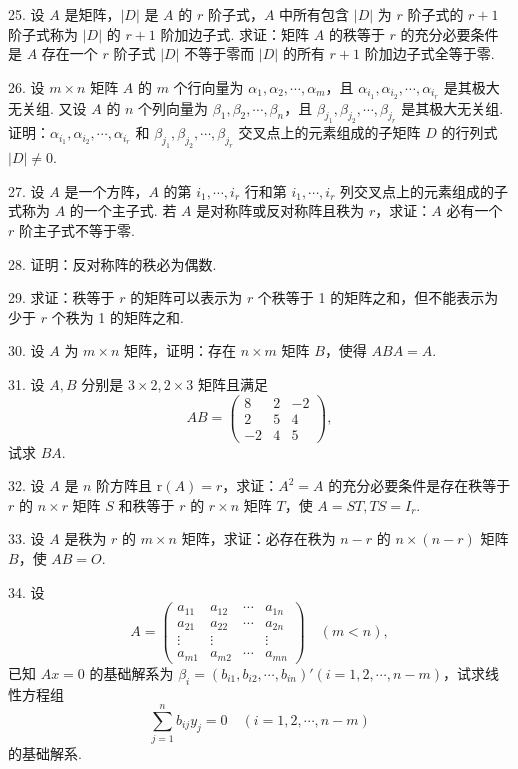 \documentclass[UTF8, 12pt, fontset=fandol, oneside]{ctexart}
\begin{document}
25. 设 $A$ 是矩阵，$|D|$ 是 $A$ 的 $r$ 阶子式，$A$ 中所有包含 $|D|$ 为 $r$ 阶子式的 $r+1$ 阶子式称为 $|D|$ 的 $r+1$ 阶加边子式. 求证：矩阵 $A$ 的秩等于 $r$ 的充分必要条件是 $A$ 存在一个 $r$ 阶子式 $|D|$ 不等于零而 $|D|$ 的所有 $r+1$ 阶加边子式全等于零.

26. 设 $m\times n$ 矩阵 $A$ 的 $m$ 个行向量为 $\alpha_1,\alpha_2,\cdots,\alpha_m$，且 $\alpha_{i_1},\alpha_{i_2},\cdots,\alpha_{i_r}$ 是其极大无关组. 又设 $A$ 的 $n$ 个列向量为 $\beta_1,\beta_2,\cdots,\beta_n$，且 $\beta_{j_1},\beta_{j_2},\cdots,\beta_{j_r}$ 是其极大无关组. 证明：$\alpha_{i_1},\alpha_{i_2},\cdots,\alpha_{i_r}$ 和 $\beta_{j_1},\beta_{j_2},\cdots,\beta_{j_r}$ 交叉点上的元素组成的子矩阵 $D$ 的行列式 $|D|\neq 0$.

27. 设 $A$ 是一个方阵，$A$ 的第 $i_1,\cdots,i_r$ 行和第 $i_1,\cdots,i_r$ 列交叉点上的元素组成的子式称为 $A$ 的一个主子式. 若 $A$ 是对称阵或反对称阵且秩为 $r$，求证：$A$ 必有一个 $r$ 阶主子式不等于零.

28. 证明：反对称阵的秩必为偶数.

29. 求证：秩等于 $r$ 的矩阵可以表示为 $r$ 个秩等于 1 的矩阵之和，但不能表示为少于 $r$ 个秩为 1 的矩阵之和.

30. 设 $A$ 为 $m\times n$ 矩阵，证明：存在 $n\times m$ 矩阵 $B$，使得 $ABA=A$.

31. 设 $A,B$ 分别是 $3\times 2,2\times 3$ 矩阵且满足
\[
AB=\left(\begin{array}{rrr}
8&2&-2\\
2&5&4\\
-2&4&5
\end{array}\right),
\]
试求 $BA$.

32. 设 $A$ 是 $n$ 阶方阵且 $\mathrm{r}(A)=r$，求证：$A^2=A$ 的充分必要条件是存在秩等于 $r$ 的 $n\times r$ 矩阵 $S$ 和秩等于 $r$ 的 $r\times n$ 矩阵 $T$，使 $A=ST,TS=I_r$.

33. 设 $A$ 是秩为 $r$ 的 $m\times n$ 矩阵，求证：必存在秩为 $n-r$ 的 $n\times(n-r)$ 矩阵 $B$，使 $AB=O$.

34. 设
\[
A=\left(\begin{array}{cccc}
a_{11}&a_{12}&\cdots&a_{1n}\\
a_{21}&a_{22}&\cdots&a_{2n}\\
\vdots&\vdots&&\vdots\\
a_{m1}&a_{m2}&\cdots&a_{mn}
\end{array}\right)\quad (m<n),
\]
已知 $Ax=0$ 的基础解系为 $\beta_i=(b_{i1},b_{i2},\cdots,b_{in})'(i=1,2,\cdots,n-m)$，试求线性方程组
\[
\sum_{j=1}^n b_{ij}y_j=0\quad (i=1,2,\cdots,n-m)
\]
的基础解系.
\end{document}
